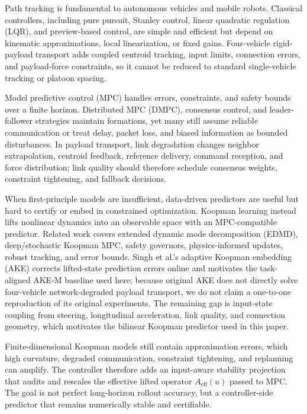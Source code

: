 \documentclass[twocolumn,3p,times,procedia]{elsarticle}
\begin{document}
Path tracking is fundamental to autonomous vehicles and mobile robots. Classical controllers, including pure pursuit, Stanley control, linear quadratic regulation (LQR), and preview-based control, are simple and efficient but depend on kinematic approximations, local linearization, or fixed gains. Four-vehicle rigid-payload transport adds coupled centroid tracking, input limits, connection errors, and payload-force constraints, so it cannot be reduced to standard single-vehicle tracking or platoon spacing.

Model predictive control (MPC) handles errors, constraints, and safety bounds over a finite horizon. Distributed MPC (DMPC), consensus control, and leader-follower strategies maintain formations, yet many still assume reliable communication or treat delay, packet loss, and biased information as bounded disturbances. In payload transport, link degradation changes neighbor extrapolation, centroid feedback, reference delivery, command reception, and force distribution; link quality should therefore schedule consensus weights, constraint tightening, and fallback decisions.

When first-principle models are insufficient, data-driven predictors are useful but hard to certify or embed in constrained optimization. Koopman learning instead lifts nonlinear dynamics into an observable space with an MPC-compatible predictor\cite{brunton2016koopmanControl,korda2018koopmanMpc,xiao2022deepKoopmanVehicle,joglekar2023koopmanExperimental}. Related work covers extended dynamic mode decomposition (EDMD), deep/stochastic Koopman MPC, safety governors, physics-informed updates, robust tracking, and error bounds\cite{kim2025ksmpc,chen2024koopmanSafetyGovernor,wang2026deepKoopmanRobustTracking,zhang2025physicsInformedAdaptiveKoopman,chen2024esoDeepKoopman,philipp2023koopmanErrorBounds,cibulka2021koopmanVehicleMpc}. Singh et al.'s adaptive Koopman embedding (AKE) corrects lifted-state prediction errors online and motivates the task-aligned AKE-M baseline used here\cite{singh2025adaptiveKoopman}; because original AKE does not directly solve four-vehicle network-degraded payload transport, we do not claim a one-to-one reproduction of its original experiments. The remaining gap is input-state coupling from steering, longitudinal acceleration, link quality, and connection geometry, which motivates the bilinear Koopman predictor used in this paper.

Finite-dimensional Koopman models still contain approximation errors, which high curvature, degraded communication, constraint tightening, and replanning can amplify. The controller therefore adds an input-aware stability projection that audits and rescales the effective lifted operator $A_{\mathrm{eff}}(u)$ passed to MPC. The goal is not perfect long-horizon rollout accuracy, but a controller-side predictor that remains numerically stable and certifiable.
\end{document}
